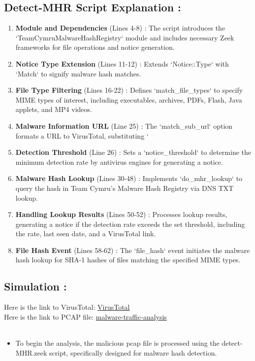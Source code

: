  \subsection{Detect-MHR Script Explanation :}
 \begin{enumerate}
    \item \textbf{Module and Dependencies} (Lines 4-8) : The script introduces the `TeamCymruMalwareHashRegistry` module and includes necessary Zeek frameworks for file operations and notice generation.
    \item \textbf{Notice Type Extension} (Lines 11-12) : Extends `Notice::Type` with `Match` to signify malware hash matches.
    \item \textbf{File Type Filtering} (Lines 16-22) : Defines `match\_file\_types` to specify MIME types of interest, including executables, archives, PDFs, Flash, Java applets, and MP4 videos.
    \item \textbf{Malware Information URL} (Line 25) : The `match\_sub\_url` option formats a URL to VirusTotal, substituting `%
    \item \textbf{Detection Threshold} (Line 26) : Sets a `notice\_threshold` to determine the minimum detection rate by antivirus engines for generating a notice.
    \item \textbf{Malware Hash Lookup} (Lines 30-48) : Implements `do\_mhr\_lookup` to query the hash in Team Cymru's Malware Hash Registry via DNS TXT lookup.
    \item \textbf{Handling Lookup Results} (Lines 50-52) : Processes lookup results, generating a notice if the detection rate exceeds the set threshold, including the rate, last seen date, and a VirusTotal link.
    \item \textbf{File Hash Event} (Lines 58-62) : The `file\_hash` event initiates the malware hash lookup for SHA-1 hashes of files matching the specified MIME types.
\end{enumerate}

\subsection{Simulation : }
Here is the link to VirusTotal: \href{https://www.virustotal.com/gui/search/a38b59afb1f03b2c2cfc14ae5a953d8e5fd6b56d}{VirusTotal}\\
Here is the link to PCAP file:
\href{https://www.malware-traffic-analysis.net/tutorials/index.html}{malware-traffic-analysis}\\\\
\begin{itemize}
    \item To begin the analysis, the malicious pcap file is processed using the detect-MHR.zeek script, specifically designed for malware hash detection.
\end{itemize}

